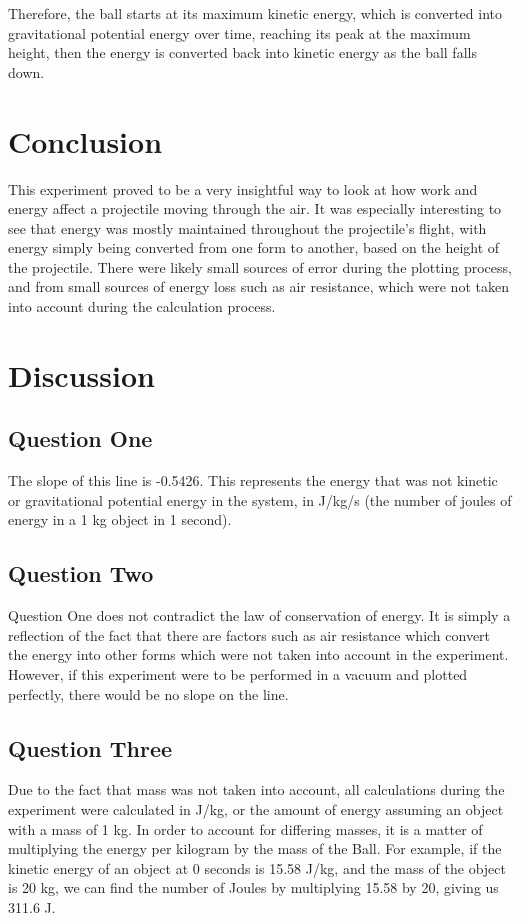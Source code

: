 \documentclass[10pt,twocolumn,letterpaper]{article}
\begin{document}
Therefore, the ball starts at its maximum kinetic energy, which is converted into gravitational potential energy over time, reaching its peak at the maximum height, then the energy is converted back into kinetic energy as the ball falls down. 

\section{Conclusion}
This experiment proved to be a very insightful way to look at how work and energy affect a projectile moving through the air. It was especially interesting to see that energy was mostly maintained throughout the projectile's flight, with energy simply being converted from one form to another, based on the height of the projectile. There were likely small sources of error during the plotting process, and from small sources of energy loss such as air resistance, which were not taken into account during the calculation process. 

\section{Discussion}
\subsection{Question One}
The slope of this line is -0.5426. This represents the energy that was not kinetic or gravitational potential energy in the system, in J/kg/s (the number of joules of energy in a 1 kg object in 1 second). 
\subsection{Question Two}
Question One does not contradict the law of conservation of energy. It is simply a reflection of the fact that there are factors such as air resistance which convert the energy into other forms which were not taken into account in the experiment. However, if this experiment were to be performed in a vacuum and plotted perfectly, there would be no slope on the line. 
\subsection{Question Three}
Due to the fact that mass was not taken into account, all calculations during the experiment were calculated in J/kg, or the amount of energy assuming an object with a mass of 1 kg. In order to account for differing masses, it is a matter of multiplying the energy per kilogram by the mass of the Ball. For example, if the kinetic energy of an object at 0 seconds is 15.58 J/kg, and the mass of the object is 20 kg, we can find the number of Joules by multiplying 15.58 by 20, giving us 311.6 J. 
\end{document}
